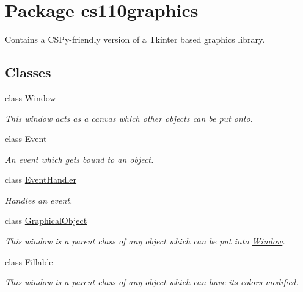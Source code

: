\hypertarget{namespacecs110graphics}{
\section{Package cs110graphics}
\label{namespacecs110graphics}
}


Contains a CSPy-\/friendly version of a Tkinter based graphics library.  
\subsection*{Classes}
\begin{DoxyCompactItemize}
\item 
class \hyperlink{classcs110graphics_1_1Window}{Window}
\begin{DoxyCompactList}\small\item\em This window acts as a canvas which other objects can be put onto. \item\end{DoxyCompactList}\item 
class \hyperlink{classcs110graphics_1_1Event}{Event}
\begin{DoxyCompactList}\small\item\em An event which gets bound to an object. \item\end{DoxyCompactList}\item 
class \hyperlink{classcs110graphics_1_1EventHandler}{EventHandler}
\begin{DoxyCompactList}\small\item\em Handles an event. \item\end{DoxyCompactList}\item 
class \hyperlink{classcs110graphics_1_1GraphicalObject}{GraphicalObject}
\begin{DoxyCompactList}\small\item\em This window is a parent class of any object which can be put into \hyperlink{classcs110graphics_1_1Window}{Window}. \item\end{DoxyCompactList}\item 
class \hyperlink{classcs110graphics_1_1Fillable}{Fillable}
\begin{DoxyCompactList}\small\item\em This window is a parent class of any object which can have its colors modified. \item\end{DoxyCompactList}\item 

\end{DoxyCompactItemize}
